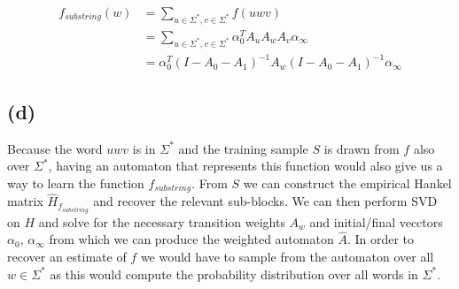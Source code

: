 \documentclass[11pt]{amsart}
\begin{document}
\begin{equation}
\begin{aligned}
f_{substring} (w)  &= \sum_{u \in \Sigma^*, v \in \Sigma^*} f(uwv) \\
			 &=  \sum_{u \in \Sigma^*, v \in \Sigma^*} \alpha_0^T A_u A_w A_v \alpha_{\infty} \\
			 &=   \alpha_0^T (I - A_0 - A_1)^{-1}  A_w (I - A_0 - A_1)^{-1}  \alpha_{\infty}
\end{aligned}
\end{equation}

\subsection{(d)}

Because the word $uwv$ is in $\Sigma^*$ and the training sample $S$ is drawn from $f$ also over $\Sigma^*$, having an automaton that represents this function would also give us a way to learn the function $f_{substring}$. From $S$ we can construct the empirical Hankel matrix $\hat{H}_{f_{substring}}$ and recover the relevant sub-blocks. We can then perform SVD on $H$ and solve for the necessary transition weights $A_w$ and initial/final vecctors $\alpha_0$, $\alpha_{\infty}$ from which we can produce the weighted automaton $\hat{A}$. In order to recover an estimate of $f$ we would have to sample from the automaton over all $w \in \Sigma^*$ as this would compute the probability distribution over all words in $\Sigma^*$. 
\end{document}

